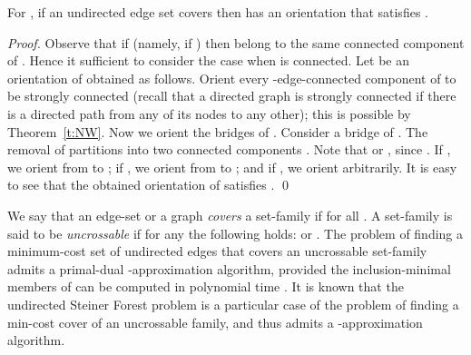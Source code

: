 \documentclass[envcountsame]{llncs}
\begin{document}
\begin{lemma} \label{l:1}
For , if an undirected edge set  covers  then  has an orientation that satisfies .
\end{lemma}
\begin{proof}
Observe that if  (namely, if ) 
then  belong to the same connected component of .
Hence it sufficient to consider the case when  is connected.
Let  be an orientation of  obtained as follows.
Orient every -edge-connected component of  to be strongly connected
(recall that a directed graph is strongly connected if there is a directed path from 
any of its nodes to any other); this is possible by Theorem~\ref{t:NW}.
Now we orient the bridges of . 
Consider a bridge  of . 
The removal of  partitions  into two connected
components .
Note that  or 
, since .
If , we orient  from  to ;
if , we orient  from  to ;
and if , we orient  arbitrarily.
It is easy to see that the obtained orientation  of  satisfies .
\qed
\end{proof}

We say that an edge-set or a graph  {\em covers} a set-family  if 
 for all .
A set-family  is said to be {\em uncrossable} if for any  
the following holds:  or 
.
The problem of finding a minimum-cost set of undirected edges that covers an 
uncrossable set-family  admits a primal-dual -approximation algorithm, 
provided the inclusion-minimal
members of  can be computed in polynomial time \cite{GGPS}.
It is known that the undirected {\sf Steiner Forest} problem is a particular case of the 
problem of finding a min-cost cover of an uncrossable family, and thus admits a 
-approximation algorithm.
 
\end{document}
